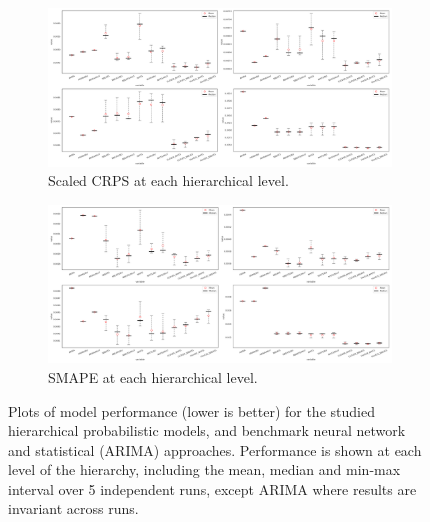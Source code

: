 \documentclass[letterpaper]{article}
\begin{document}
\begin{figure}
    \centering
     \begin{subfigure}[b]{\textwidth}
         \centering
         \includegraphics[width=\textwidth]{minmax_benchmark_CRPS.png}
         \caption{Scaled CRPS at each hierarchical level.}
         \label{fig:benchsub1}
     \end{subfigure}
     \begin{subfigure}[b]{\textwidth}
         \centering
         \includegraphics[width=\textwidth]{minmax_benchmark_SMAPE.png}
         \caption{SMAPE at each hierarchical level.}
         \label{fig:benchsub2}
     \end{subfigure}
     \hfill
        \caption{
Plots of model performance (lower is better) for the studied hierarchical probabilistic models, and benchmark neural network and statistical (ARIMA) approaches. Performance is shown at each level of the hierarchy, including the mean, median and min-max interval over 5 independent runs, except ARIMA where results are invariant across runs. 
}
    \label{fig:benchmarkplots}
\end{figure}
\end{document}

